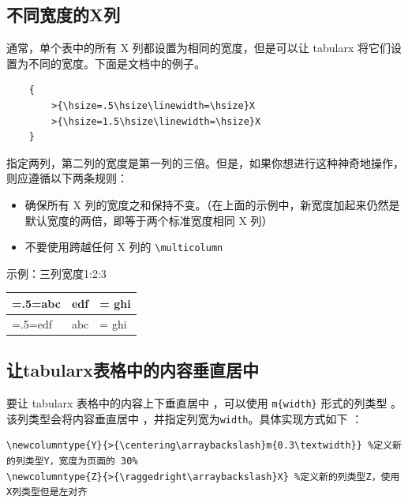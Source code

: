 \subsection{不同宽度的X列}

通常，单个表中的所有 X 列都设置为相同的宽度，但是可以让 tabularx 将它们设置为不同的宽度。下面是文档中的例子。

\begin{lstlisting}
    {
        >{\hsize=.5\hsize\linewidth=\hsize}X
        >{\hsize=1.5\hsize\linewidth=\hsize}X
    }
\end{lstlisting}

指定两列，第二列的宽度是第一列的三倍。但是，如果你想进行这种神奇地操作，则应遵循以下两条规则：

\begin{itemize}
  \item 确保所有 X 列的宽度之和保持不变。（在上面的示例中，新宽度加起来仍然是默认宽度的两倍，即等于两个标准宽度相同 X 列）
  \item 不要使用跨越任何 X 列的 \verb|\multicolumn|
\end{itemize}

示例：三列宽度1:2:3

\begin{table}[h]
    \centering
    \begin{tabularx}{0.8\textwidth} { 
        | >{\raggedright\arraybackslash\hsize=.5\hsize\linewidth=\hsize}X 
        | >{\centering\arraybackslash}X 
        | >{\raggedleft\arraybackslash\hsize=1.5\hsize\linewidth=\hsize}X 
        | }
        \hline
        abc & edf & ghi\\
        \hline
        edf & abc & ghi\\
        \hline
    \end{tabularx}
\end{table}

\subsection{让tabularx表格中的内容垂直居中}
要让 tabularx 表格中的内容上下垂直居中 ，可以使用 \verb|m{width}| 形式的列类型 。该列类型会将内容垂直居中 ，并指定列宽为\verb|width|。具体实现方式如下 ：

\begin{lstlisting}
\newcolumntype{Y}{>{\centering\arraybackslash}m{0.3\textwidth}} %定义新的列类型Y，宽度为页面的 30%
\newcolumntype{Z}{>{\raggedright\arraybackslash}X} %定义新的列类型Z，使用X列类型但是左对齐
\end{lstlisting}

